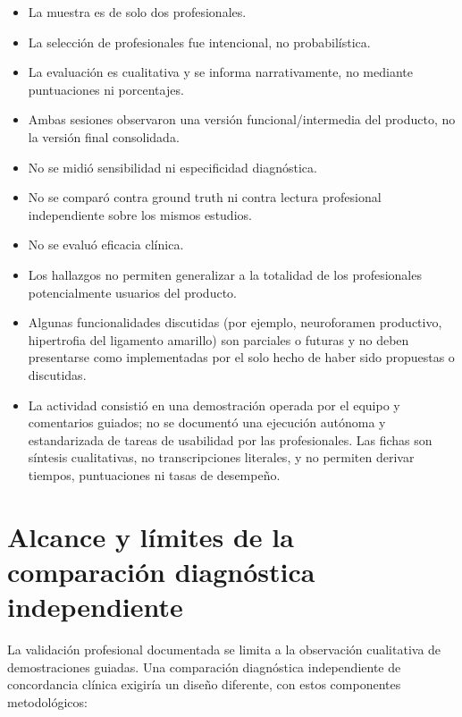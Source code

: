 \begin{itemize}
    \item La muestra es de solo dos profesionales.
    \item La selección de profesionales fue intencional, no probabilística.
    \item La evaluación es cualitativa y se informa narrativamente, no mediante puntuaciones ni porcentajes.
    \item Ambas sesiones observaron una versión funcional/intermedia del producto, no la versión final consolidada.
    \item No se midió sensibilidad ni especificidad diagnóstica.
    \item No se comparó contra ground truth ni contra lectura profesional independiente sobre los mismos estudios.
    \item No se evaluó eficacia clínica.
    \item Los hallazgos no permiten generalizar a la totalidad de los profesionales potencialmente usuarios del producto.
    \item Algunas funcionalidades discutidas (por ejemplo, neuroforamen productivo, hipertrofia del ligamento amarillo) son parciales o futuras y no deben presentarse como implementadas por el solo hecho de haber sido propuestas o discutidas.
    \item La actividad consistió en una demostración operada por el equipo y comentarios guiados; no se documentó una ejecución autónoma y estandarizada de tareas de usabilidad por las profesionales. Las fichas son síntesis cualitativas, no transcripciones literales, y no permiten derivar tiempos, puntuaciones ni tasas de desempeño.
\end{itemize}

\section{Alcance y límites de la comparación diagnóstica independiente}
\label{anexo:h-validacion-cruzada-no-ejecutada}

La validación profesional documentada se limita a la observación cualitativa de demostraciones guiadas. Una comparación diagnóstica independiente de concordancia clínica exigiría un diseño diferente, con estos componentes metodológicos:

